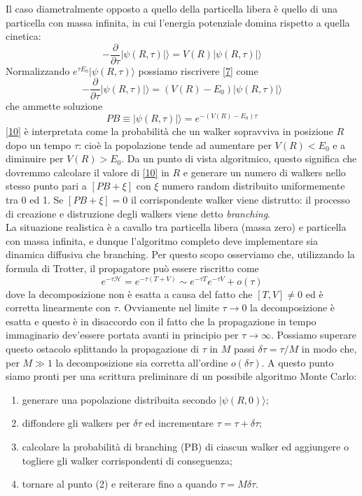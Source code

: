 \documentclass[11pt,a4paper]{article}
\begin{document}
Il caso diametralmente opposto a quello della particella libera è quello di una particella con massa infinita, in cui l'energia potenziale domina rispetto a quella cinetica:
\begin{equation}\label{7}
-\frac{\partial}{\partial \tau}|\psi(R,\tau)|\rangle =  V(R)|\psi(R,\tau)|\rangle
\end{equation}
Normalizzando $e^{\tau E_0}|\psi(R,\tau)\rangle$ possiamo riscrivere \eqref{7} come
\begin{equation}
-\frac{\partial}{\partial \tau}|\psi(R,\tau)|\rangle =  (V(R)-E_0)|\psi(R,\tau)|\rangle
\end{equation}
che ammette soluzione
\begin{equation}\label{10}
PB \equiv |\psi(R,\tau)|\rangle = e^{-(V(R)-E_0)\tau}
\end{equation}
\eqref{10} è interpretata come la probabilità che un walker sopravviva in posizione $R$ dopo un tempo $\tau$: cioè la popolazione tende ad aumentare per $V(R)<E_0$ e a diminuire per $V(R)>E_0$. Da un punto di vista algoritmico, questo significa che dovremmo calcolare il valore di \eqref{10} in $R$ e generare un numero di walkers nello stesso punto pari a $[PB+\xi]$ con $\xi$ numero random distribuito uniformemente tra 0 ed 1. Se $[PB+\xi]=0$ il corrispondente walker viene distrutto: il processo di creazione e distruzione degli walkers viene detto \emph{branching}. \\
La situazione realistica è a cavallo tra particella libera (massa zero) e particella con massa infinita, e dunque l'algoritmo completo deve implementare sia dinamica diffusiva che branching. Per questo scopo osserviamo che, utilizzando la formula di Trotter, il propagatore può essere riscritto come
\begin{equation}
e^{-\tau \mathcal{H}} = e^{-\tau(T+V)} \sim e^{-\tau T}e^{-\tau V} + o(\tau)
\end{equation}
dove la decomposizione non è esatta a causa del fatto che $[T,V] \not = 0$ ed è corretta linearmente con $\tau$. Ovviamente nel limite $\tau \to 0$ la decomposizione è esatta e questo è in disaccordo con il fatto che la propagazione in tempo immaginario dev'essere portata avanti in principio per $\tau \to \infty$. Possiamo superare questo ostacolo splittando la propagazione di $\tau$ in $M$ passi $\delta \tau = \tau/M$ in modo che, per $M \gg 1$ la decomposizione sia corretta all'ordine $o(\delta \tau)$. A questo punto siamo pronti per una scrittura preliminare di un possibile algoritmo Monte Carlo:
\begin{enumerate}
	\item generare una popolazione distribuita secondo $|\psi(R,0)\rangle$;
	\item diffondere gli walkers per $\delta \tau$ ed incrementare $\tau = \tau + \delta\tau$;
	\item calcolare la probabilità di branching (PB) di ciascun walker ed aggiungere o togliere gli walker corrispondenti di conseguenza;
	\item tornare al punto (2) e reiterare fino a quando $\tau = M \delta \tau$.  
\end{enumerate}
\end{document}

